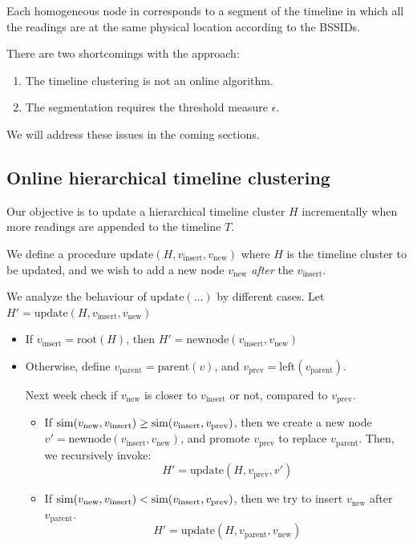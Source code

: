 Each homogeneous node in corresponds to a segment of the timeline in which all
the readings are at the same physical location according to the BSSIDs.

There are two shortcomings with the approach:

\begin{enumerate}
    \item The timeline clustering is not an online algorithm.
    \item The segmentation requires the threshold measure $\epsilon$.
\end{enumerate}

We will address these issues in the coming sections.

\subsection{Online hierarchical timeline clustering}

Our objective is to update a hierarchical timeline cluster $H$ incrementally when
more readings are appended to the timeline $T$.

We define a procedure $\mathrm{update}(H, v_\mathrm{insert}, v_\mathrm{new})$
where $H$ is the timeline cluster to be updated, and we wish to add a new node
$v_\mathrm{new}$ {\em after} the $v_\mathrm{insert}$.

We analyze the behaviour of $\mathrm{update}(\dots)$ by different cases.
Let $H' = \mathrm{update}(H, v_\mathrm{insert}, v_\mathrm{new})$

\begin{itemize}
    \item If $v_\mathrm{insert} = \mathrm{root}(H)$, then
        $H' = \mathrm{newnode}(v_\mathrm{insert}, v_\mathrm{new})$
    \item Otherwise, define $v_\mathrm{parent} = \mathrm{parent}(v)$, and
        $v_\mathrm{prev} = \mathrm{left}(v_\mathrm{parent})$.

        Next week check if $v_\mathrm{new}$ is closer to $v_\mathrm{insert}$ or
        not, compared to $v_\mathrm{prev}$.
        \begin{itemize}
            \item If $\mathrm{sim}(v_\mathrm{new}, v_\mathrm{insert}) \geq 
                      \mathrm{sim}(v_\mathrm{insert}, v_\mathrm{prev})$, then
                    we create a new node $v' = \mathrm{newnode}(v_\mathrm{insert},
                    v_\mathrm{new})$, and promote $v_\mathrm{prev}$ to replace
                    $v_\mathrm{parent}$.  Then, we recursively invoke:
                    $$H' = \mathrm{update}(H, v_\mathrm{prev}, v')$$
            \item If $\mathrm{sim}(v_\mathrm{new}, v_\mathrm{insert})  <
                      \mathrm{sim}(v_\mathrm{insert}, v_\mathrm{prev})$, then
                    we try to insert $v_\mathrm{new}$ after $v_\mathrm{parent}$.
                    $$H' = \mathrm{update}(H, v_\mathrm{parent}, v_\mathrm{new})$$
        \end{itemize}
\end{itemize}


